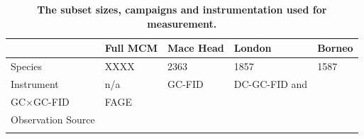 \begin{table}[H]
\begin{tabular}{l|llll}
                   & Full MCM   & Mace Head      & London      & Borneo        \\ \hline
Species            & XXXX       & 2363           & 1857        & 1587          \\
Instrument            & n/a       & GC-FID           &   DC-GC-FID and\\ GC$\times$GC-FID      & FAGE          \\
Observation Source & \citep{mcm} & \citep{lewis97} & \citep{clfo}\\\citep{dunmore} & \citep{borneo}\\
\end{tabular}
\caption{\textbf{The subset sizes, campaigns and instrumentation used for measurement.}}
\label{table:subsetsize}
\end{table}



